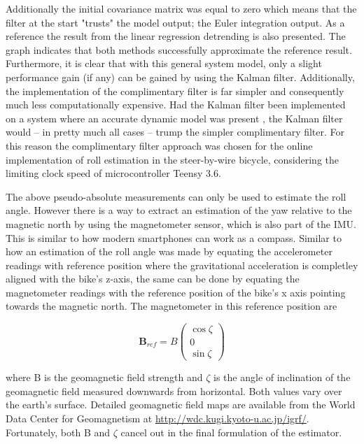 Additionally the initial covariance matrix was equal to zero which means that the filter at the start "trusts" the model output; the Euler integration output. As a reference the result from the linear regression detrending is also presented. The graph indicates that both methods successfully approximate the reference result. Furthermore, it is clear that with this general system model, only a slight performance gain (if any) can be gained by using the Kalman filter. Additionally, the implementation of the complimentary filter is far simpler and consequently much less computationally expensive. Had the Kalman filter been implemented on a system where  an accurate dynamic model was present , the Kalman filter would – in pretty much all cases – trump the simpler complimentary filter. For this reason the complimentary filter approach was chosen for the online implementation of roll estimation in the steer-by-wire bicycle, considering the limiting clock speed of microcontroller Teensy 3.6.

The above pseudo-absolute measurements can only be used to estimate the roll angle. However there is a way to extract an estimation of the yaw relative to the magnetic north by using the magnetometer sensor, which is also part of the IMU. This is similar to how modern smartphones can work as a compass. Similar to how an estimation of the roll angle was made by equating the accelerometer readings with  reference position where the gravitational acceleration is completley aligned with the bike's z-axis, the same can be done by equating the magnetometer readings with the reference position of the bike's x axis pointing towards the magnetic north. The magnetometer in this reference position are 

\begin{equation}
\boldsymbol{B}_{ref}=B\left(\begin{array}{c}{\cos \zeta} \\ {0} \\ {\sin \zeta}\end{array}\right)
\end{equation}

where B is the geomagnetic field strength and \ensuremath{\zeta} is the angle of inclination of the geomagnetic field measured downwards from horizontal. Both values vary over the earth's surface. Detailed geomagnetic field maps are available from the World Data Center for Geomagnetism at \hyperref[site]{http://wdc.kugi.kyoto-u.ac.jp/igrf/}. Fortunately, both B and \ensuremath{\zeta} cancel out in the final formulation of the estimator.


